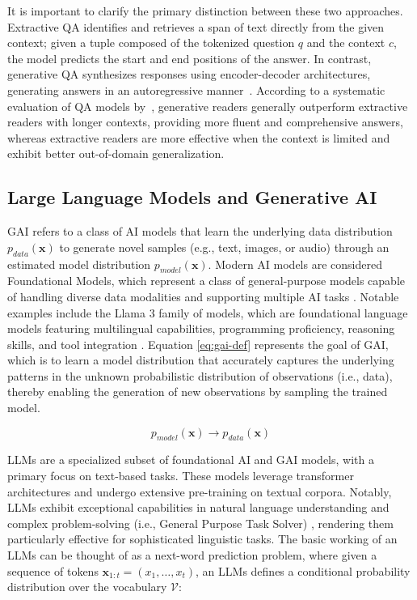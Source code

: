 \documentclass[runningheads]{llncs}
\begin{document}
It is important to clarify the primary distinction between these two
approaches. Extractive QA identifies and retrieves a span of text
directly from the given context; given a tuple composed of the
tokenized question $q$ and the context $c$, the model predicts the
start and end positions of the answer. In contrast, generative QA
synthesizes responses using encoder-decoder architectures, generating
answers in an autoregressive manner~\cite{Luo2022NLP}. According to a
systematic evaluation of QA models by~\cite{Luo2022NLP}, generative
readers generally outperform extractive readers with longer contexts,
providing more fluent and comprehensive answers, whereas extractive
readers are more effective when the context is limited and exhibit
better out-of-domain generalization.


\subsection{Large Language Models and Generative AI}
\label{sec:large-lang-models}

GAI refers to a class of AI models that learn the underlying data
distribution $p_{data}(\mathbf{x})$ to generate novel samples (e.g.,
text, images, or audio) through an estimated model distribution
$p_{model}(\mathbf{x})$\cite{foster2022generative}. Modern AI models
are considered Foundational Models, which represent a class of
general-purpose models capable of handling diverse data modalities and
supporting multiple AI tasks \cite{Grattafiori2024}. Notable examples
include the Llama 3 family of models, which are foundational language
models featuring multilingual capabilities, programming proficiency,
reasoning skills, and tool integration
\cite{Grattafiori2024}. Equation \eqref{eq:gai-def} represents the
goal of GAI, which is to learn a model distribution that accurately
captures the underlying patterns in the unknown probabilistic
distribution of observations (i.e., data), thereby enabling the
generation of new observations by sampling the trained model.


\begin{equation}
  \label{eq:gai-def}
  p_{model}(\mathbf{x}) \to p_{data}(\mathbf{x})
\end{equation}


LLMs are a specialized subset of foundational
AI and GAI models, with a primary focus on text-based tasks. These
models leverage transformer architectures
\cite{Minaee2025,Grattafiori2024} and undergo extensive pre-training
on textual corpora. Notably, LLMs exhibit exceptional capabilities in
natural language understanding and complex problem-solving
(i.e., General Purpose Task Solver) \cite{Zhao2023}, rendering them
particularly effective for sophisticated linguistic tasks. The basic
working of an LLMs can be thought of as a next-word prediction problem,
where given a sequence of tokens
$\mathbf{x}_{1:t} = (x_1, \ldots, x_t)$, an LLMs defines a conditional
probability distribution over the vocabulary $\mathcal{V}$:
\end{document}
